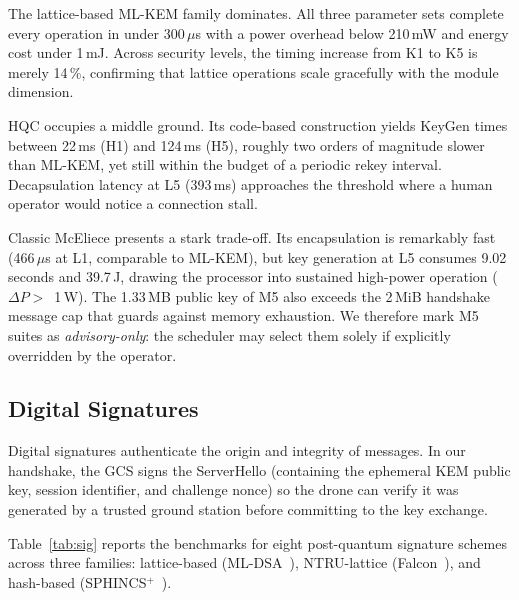 \documentclass[conference]{IEEEtran}
\begin{document}
The lattice-based ML-KEM family dominates.  All three parameter sets
complete every operation in under 300\,$\mu$s with a power overhead
below 210\,mW and energy cost under 1\,mJ.  Across security levels,
the timing increase from K1 to K5 is merely 14\,\%, confirming that
lattice operations scale gracefully with the module dimension.

HQC occupies a middle ground.  Its code-based construction yields
KeyGen times between 22\,ms (H1) and 124\,ms (H5), roughly two
orders of magnitude slower than ML-KEM, yet still within the budget
of a periodic rekey interval.  Decapsulation latency at L5 (393\,ms)
approaches the threshold where a human operator would notice a
connection stall.

Classic McEliece presents a stark trade-off.  Its encapsulation is
remarkably fast (466\,$\mu$s at L1, comparable to ML-KEM), but key
generation at L5 consumes 9.02 seconds and 39.7\,J, drawing the
processor into sustained high-power operation ($\Delta P >$~1\,W).
The 1.33\,MB public key of M5 also exceeds the 2\,MiB handshake
message cap that guards against memory exhaustion.  We therefore
mark M5 suites as \emph{advisory-only}: the scheduler may select
them solely if explicitly overridden by the operator.

\subsection{Digital Signatures}
\label{sec:sig}

Digital signatures authenticate the origin and integrity of messages.
In our handshake, the GCS signs the ServerHello (containing the
ephemeral KEM public key, session identifier, and challenge nonce)
so the drone can verify it was generated by a trusted ground station
before committing to the key exchange.

Table~\ref{tab:sig} reports the benchmarks for eight post-quantum
signature schemes across three families: lattice-based
(ML-DSA~\cite{dilithium}), NTRU-lattice (Falcon~\cite{falcon}), and
hash-based (SPHINCS$^+$~\cite{sphincsplus}).
\end{document}
